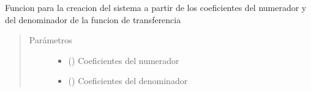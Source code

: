 \documentclass[letterpaper,10pt,spanish]{sphinxmanual}
\begin{document}
\begin{fulllineitems}
\label{\detokenize{codigos/rutinas_PID:rutinas_PID.system_creator_tf}}
Funcion para la creacion del sistema a partir de los coeficientes del numerador y del denominador de la funcion de transferencia
\begin{quote}\begin{description}
\item[{Parámetros}] \leavevmode\begin{itemize}
\item {} 
 () \textendash{} Coeficientes del numerador

\item {} 
 () \textendash{} Coeficientes del denominador

\end{itemize}

\end{description}\end{quote}

\end{fulllineitems}

\end{document}
